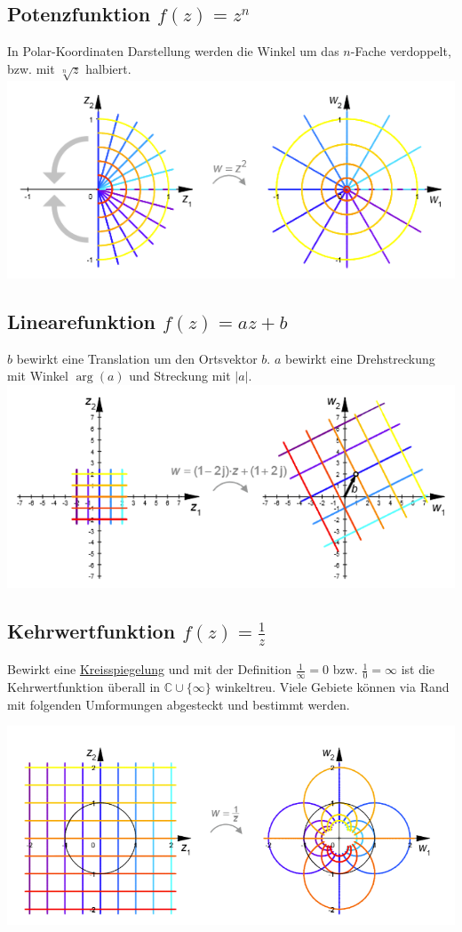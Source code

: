 \subsection{Potenzfunktion $f(z) = z^n$}
In Polar-Koordinaten Darstellung werden die Winkel um das $n$-Fache verdoppelt, bzw. mit $\sqrt[n]{z}$ halbiert.
\includegraphics[width=\columnwidth]{Images/quadrat_funktion}

\subsection{Linearefunktion $f(z) = az + b$}
$b$ bewirkt eine Translation um den Ortsvektor $b$. $a$ bewirkt eine Drehstreckung mit Winkel $\arg(a)$ und Streckung mit $|a|$.
\includegraphics[width=\columnwidth]{Images/lineare_funktion}


\subsection{Kehrwertfunktion $f(z) = \frac{1}{z}$}
Bewirkt eine \underline{Kreisspiegelung} und mit der Definition $\frac{1}{\infty} = 0$ bzw. $\frac{1}{0} = \infty$ ist die Kehrwertfunktion überall in $\mathbb{C}\cup\{\infty\}$ winkeltreu. Viele Gebiete können via Rand mit folgenden Umformungen abgesteckt und bestimmt werden.

\includegraphics[width=\columnwidth]{Images/kehrwert_funktion}\\

